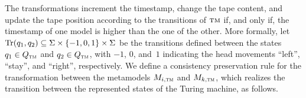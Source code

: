 The transformations increment the timestamp, change the tape content, and update the tape position according to the transitions of $\textsc{tm}$ if, and only if, the timestamp of one model is higher than the one of the other.
More formally, let $\operatorname{Tr}(q_1,q_2) \subseteq \Sigma \times \{ -1,0,1 \} \times \Sigma$ be the transitions defined between the states $q_1 \in Q_{\textsc{tm}}$ and $q_2 \in Q_{\textsc{tm}}$, with $-1$, $0$, and~$1$ indicating the head movements \enquote{left}, \enquote{stay}, and \enquote{right}, respectively. 
We define a consistency preservation rule for the transformation between the metamodels $\metamodel{M}{i, \TuringMachine}$ and $\metamodel{M}{k, \TuringMachine}$, which realizes the transition between the represented states of the Turing machine, as follows.
